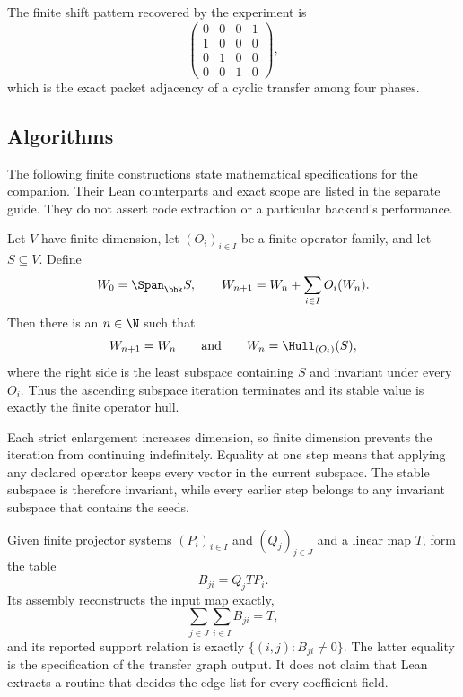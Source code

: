The finite shift pattern recovered by the experiment is
\[
\begin{pmatrix}
0&0&0&1\\
1&0&0&0\\
0&1&0&0\\
0&0&1&0
\end{pmatrix},
\]
which is the exact packet adjacency of a cyclic transfer among four phases.

\subsection{Algorithms}

The following finite constructions state mathematical specifications for the companion. Their Lean counterparts and exact scope are listed in the separate guide. They do not assert code extraction or a particular backend's performance.

\begin{construction}
\label{con:orbit-hull-algorithm}
Let $V$ have finite dimension, let $(O_i)_{i\in I}$ be a finite operator
family, and let $S\subseteq V$.  Define
\[
W_0=\Span_{\bbk}S,
\qquad
W_{n+1}=W_n+\sum_{i\in I}O_i(W_n).
\]
Then there is an $n\in\N$ such that
\[
W_{n+1}=W_n
\qquad\text{and}\qquad
W_n=\Hull_{(O_i)}(S),
\]
where the right side is the least subspace containing $S$ and invariant under
every $O_i$.  Thus the ascending subspace iteration terminates and its stable
value is exactly the finite operator hull.

Each strict enlargement increases dimension, so finite dimension prevents the iteration from continuing indefinitely. Equality at one step means that applying any declared operator keeps every vector in the current subspace. The stable subspace is therefore invariant, while every earlier step belongs to any invariant subspace that contains the seeds.
\end{construction}

\begin{construction}
\label{con:transfer-block-algorithm}
Given finite projector systems $(P_i)_{i\in I}$ and $(Q_j)_{j\in J}$ and a
linear map $T$, form the table
\[
B_{ji}=Q_jTP_i.
\]
Its assembly reconstructs the input map exactly,
\[
\sum_{j\in J}\sum_{i\in I}B_{ji}=T,
\]
and its reported support relation is exactly
$\{(i,j):B_{ji}\ne0\}$.  The latter equality is the specification of the
transfer graph output. It does not claim that Lean extracts a routine that decides the edge list for every coefficient field.
\end{construction}

